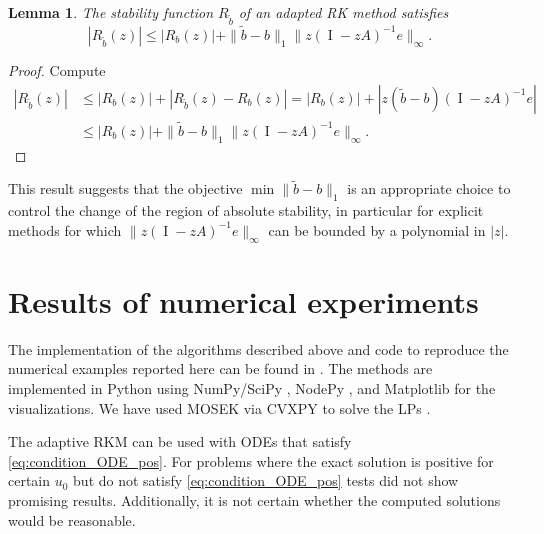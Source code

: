 \documentclass[a4paper]{article}
\numberwithin{equation}{section}
\theoremstyle{plain}
\newtheorem{lemma}[theorem]{Lemma}
\theoremstyle{definition}
\numberwithin{theorem}{section}
\newcommand{\1}{\mathbbm{1}}
\newcommand{\I}{\operatorname{I}}
\newcommand{\bt}{\tilde{b}}
\begin{document}
\begin{lemma}
  The stability function $R_{\bt}$ of an adapted RK method
  satisfies
  \begin{equation}
    | R_{\bt}(z) |
    \le
    | R_{b}(z) |
    + \| \bt - b \|_1 \| z (\I - z A)^{-1} e \|_\infty.
  \end{equation}
\end{lemma}
\begin{proof}
  Compute
  \begin{equation}
  \begin{aligned}
    | R_{\bt}(z) |
    &\le
    | R_{b}(z) |
    + | R_{\bt}(z) - R_{b}(z) |
    =
    | R_{b}(z) |
    + | z (\bt - b) (\I - z A)^{-1} e|
    \\
    &\le
    | R_{b}(z) |
    + \| \bt - b \|_1 \| z (\I - z A)^{-1} e \|_\infty.
  \end{aligned}
  \end{equation}
\end{proof}
This result suggests that the objective $\min \| \bt - b \|_1 $ is an
appropriate choice to control the change of the region of absolute stability,
in particular for explicit methods for which
$\| z (\I - z A)^{-1} e \|_\infty$ can be bounded by a polynomial
in $|z|$.


\section{Results of numerical experiments}\label{sec:Numeric_Results}

The implementation of the algorithms described above and code to
reproduce the numerical examples reported here can be found in
\cite{nusslein2020positivityRepro}.
The methods are implemented in Python using NumPy/SciPy
\cite{virtanen2020scipy}, NodePy \cite{nodepy08}, and
Matplotlib \cite{hunter2007matplotlib} for the visualizations.
We have used MOSEK \cite{mosek} via CVXPY to solve the LPs
\cite{cvxpy, cvxpy_rewriting}.

The adaptive RKM can be used with ODEs that satisfy \eqref{eq:condition_ODE_pos}.
For problems where the exact solution is positive for certain $u_0$ but do not satisfy \eqref{eq:condition_ODE_pos} tests did not show promising results. Additionally, it is not certain whether the computed solutions would be reasonable.
\end{document}
